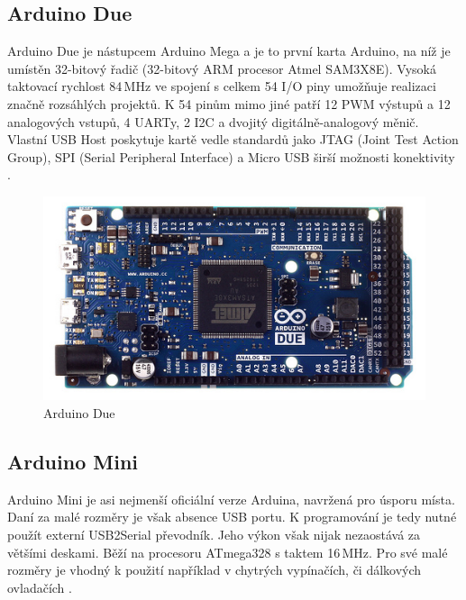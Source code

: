 		\subsection{Arduino Due} 
		Arduino Due je nástupcem Arduino Mega a je to první karta Arduino, na níž je umístěn 32-bitový řadič (32-bitový ARM procesor
		Atmel SAM3X8E). Vysoká taktovací rychlost 84\,MHz ve spojení s celkem 54 I/O piny umožňuje realizaci značně rozsáhlých projektů. K 54 pinům mimo jiné patří 12 PWM výstupů a 12 analogových vstupů, 4 UARTy, 2 I2C a dvojitý digitálně-analogový měnič. Vlastní USB Host poskytuje kartě vedle standardů jako JTAG (Joint Test Action Group), SPI (Serial Peripheral Interface) a Micro USB širší možnosti konektivity \cite{ArduinoDue}.	
		
				\begin{figure}[!h]
  \begin{center}
    \includegraphics[scale=0.5]{obrazky/emded_arduino_due}
  \end{center}
  \caption{Arduino Due\cite{ArduinoDue}}
\end{figure}

		

\subsection{Arduino Mini} 
	Arduino Mini je asi nejmenší oficiální verze Arduina, navržená pro úsporu místa. Daní za malé rozměry je však absence USB portu. K programování je tedy nutné použít externí USB2Serial převodník. Jeho výkon však nijak nezaostává za většími deskami. Běží na procesoru ATmega328 s taktem 16\,MHz. Pro své malé rozměry je vhodný k použití například v chytrých vypínačích, či dálkových ovladačích \cite{ArduinoMini}.	
	

